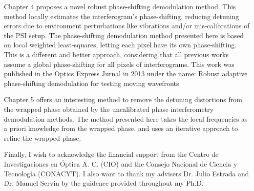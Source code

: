 Chapter 4 proposes a novel robust phase-shifting demodulation method. 
This method locally estimates the interferogram's phase-shifting, reducing 
detuning errors due to environment perturbations like vibrations and/or 
mis-calibrations of the PSI setup. The phase-shifting demodulation method
presented here is based on local weighted least-squares, letting each pixel
have its own phase-shifting. This is a different and better approach, considering 
that all previous works assume a global phase-shifting for all pixels
of interferograms. This work was published in the Optics Express Jurnal in 2013 
under the name: Robust adaptive phase-shifting demodulation for testing moving 
wavefronts \cite{Medina:13}


Chapter 5 offers an interesting method to remove the detuning distortions from 
the wrapped phase obtained by the uncalibrated phase interferometry demodulation 
methods. The method presented here takes the local frequencies as a priori 
knowledge from the wrapped phase, and uses an iterative approach to refine the 
wrapped phase.

Finally, I wish to acknowledge the financial support from the Centro de 
Investigaciones en \'Optica A. C. (CIO) and the Consejo Nacional de Ciencia y 
Tecnolog\'ia (CONACYT). I also want to thank my advisers Dr. Julio Estrada and
Dr. Manuel Servin by the guidence provided throughout my Ph.D.